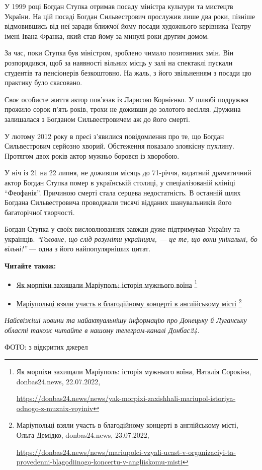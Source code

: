 
У 1999 році Богдан Ступка отримав посаду міністра культури та мистецтв України.
На цій посаді Богдан Сильвестрович прослужив лише два роки, пізніше
відмовившись від неї заради ближчої йому посади художнього керівника Театру
імені Івана Франка, який став йому за минулі роки другим домом.

За час, поки Ступка був міністром, зроблено чимало позитивних змін. Він
розпорядився, щоб за наявності вільних місць у залі на спектаклі пускали
студентів та пенсіонерів безкоштовно. На жаль, з його звільненням з посади цю
практику було скасовано.

Своє особисте життя актор пов'язав із Ларисою Корнієнко. У шлюбі подружжя
прожило сорок п'ять років, трохи не доживши до золотого весілля. Дружина
залишалася з Богданом Сильвестровичем аж до його смерті.


У лютому 2012 року в пресі з'явилися повідомлення про те, що Богдан
Сильвестрович серйозно хворий. Обстеження показало злоякісну пухлину. Протягом
двох років актор мужньо боровся із хворобою.

У ніч із 21 на 22 липня, не доживши місяць до 71-річчя, видатний драматичний
актор Богдан Ступка помер в українській столиці, у спеціалізованій клініці
\enquote{Феофанія}. Причиною смерті стала серцева недостатність. В останній шлях
Богдана Сильвестровича проводжали тисячі відданих шанувальників його
багаторічної творчості.

Богдан Ступка у своїх висловлюваннях завжди дуже підтримував Україну та
українців. \emph{\enquote{Головне, що слід розуміти українцям, — це те, що вони унікальні, бо
вільні!}} — одна з його найпопулярніших цитат.

\textbf{Читайте також:}

\begin{itemize} %
\item \href{https://donbas24.news/news/yak-morpixi-zaxishhali-mariupol-istoriya-odnogo-z-muznix-voyiniv}{Як морпіхи захищали Маріуполь: історія мужнього воїна}%
\footnote{Як морпіхи захищали Маріуполь: історія мужнього воїна, Наталія Сорокіна, donbas24.news, 22.07.2022, \par\url{https://donbas24.news/news/yak-morpixi-zaxishhali-mariupol-istoriya-odnogo-z-muznix-voyiniv}}

\item \href{https://donbas24.news/news/mariupolci-vzyali-ucast-v-organizaciyi-ta-provedenni-blagodiinogo-koncertu-v-angliiskomu-misti}{%
Маріупольці взяли участь в благодійному концерті в англійському місті}%
\footnote{Маріупольці взяли участь в благодійному концерті в англійському місті, Ольга Демідко, donbas24.news, 23.07.2022, \par%
\url{https://donbas24.news/news/mariupolci-vzyali-ucast-v-organizaciyi-ta-provedenni-blagodiinogo-koncertu-v-angliiskomu-misti}%
}
\end{itemize} %

\begingroup
\em
Найсвіжіші новини та найактуальнішу інформацію про Донецьку й Луганську області також читайте в нашому телеграм-каналі Донбас24.

ФОТО: з відкритих джерел
\endgroup
